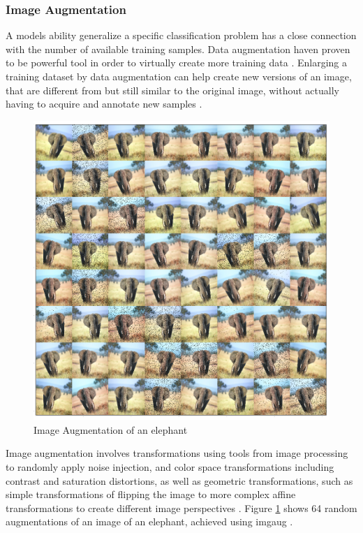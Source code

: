 \subsubsection{Image Augmentation}

A models ability generalize a specific classification problem has a close connection with the number of available training samples. Data augmentation haven proven to be powerful tool in order to virtually create more training data \cite{perez_effectiveness_2017}. Enlarging a training dataset by data augmentation can help create new versions of an image, that are different from but still similar to the original image, without actually having to acquire and annotate new samples \cite{goodfellow_deep_2016}.  

\begin{figure}[H]
	\centering
	\includegraphics[width=.7\linewidth]{figures/augmentation/augmentation_high_resolution.png}
	\caption[Image Augmentaion Example]{Image Augmentation of an elephant}
	\label{fig:augmentation}
\end{figure}

Image augmentation involves transformations using tools from image processing to randomly apply noise injection, and color space transformations including contrast and saturation distortions, as well as geometric transformations, such as simple transformations of flipping the image to more complex affine transformations to create different image perspectives \cite{shorten_survey_2019}. Figure \ref{fig:augmentation} shows 64 random augmentations of an image of an elephant, achieved using \gls{imgaug} \cite{jung_imgaug:_nodate}. 

